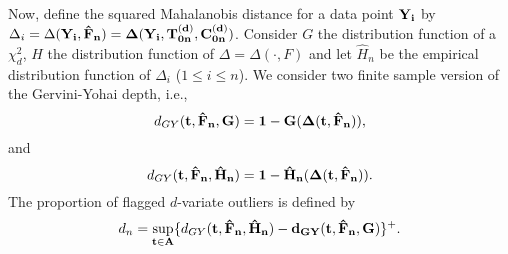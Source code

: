 \documentclass[a4paper,12pt]{article}
\begin{document}
Now, define the squared Mahalanobis distance for a data point $\bf{Y}_i$ by $\Delta_i = \Delta(\bf{Y}_i, \hat{F}_n) = \Delta(\bf{Y}_i, \bf{T}_{0n}^{(d)}, \bf{C}_{0n}^{(d)})$. Consider $G$ the distribution function of a $\chi_d^2$, $H$ the distribution function of $\Delta = \Delta(\cdot, F)$ and let $\hat{H}_n$ be the empirical distribution function of $\Delta_i$ ($1 \le i \le n$). We consider two finite sample version of the Gervini-Yohai depth, i.e., 
\begin{equation*}
d_{GY}(\bf{t}, \hat{F}_n, G) = 1 - G(\Delta(\bf{t}, \hat{F}_n)) ,
\end{equation*}
and
\begin{equation*}
d_{GY}(\bf{t}, \hat{F}_n, \hat{H}_n) = 1 - \hat{H}_n(\Delta(\bf{t}, \hat{F}_n)) .
\end{equation*}
The proportion of flagged $d$-variate outliers is defined by
\begin{equation*}
d_n = \sup_{\bf{t} \in A} \{ d_{GY}(\bf{t}, \hat{F}_n, \hat{H}_n) - d_{GY}(\bf{t}, \hat{F}_n, G) \}^+ .
\end{equation*}
\end{document}
